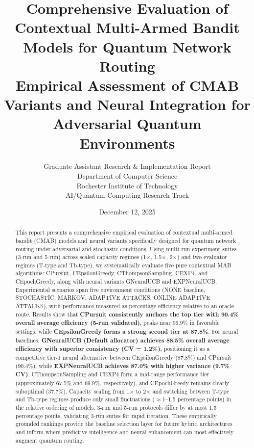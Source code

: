 \documentclass[12pt,a4paper]{article}
\title{\textbf{Comprehensive Evaluation of Contextual Multi-Armed Bandit Models for Quantum Network Routing}\\
\large{Empirical Assessment of CMAB Variants and Neural Integration for Adversarial Quantum Environments}}
\author{Graduate Assistant Research \& Implementation Report\\ 
Department of Computer Science \\ 
Rochester Institute of Technology \\ 
AI/Quantum Computing Research Track}
\date{December 12, 2025}
\newcommand{\performance}[1]{\textcolor{performancecolor}{\textbf{#1}}}
\newcommand{\legacy}[1]{\textcolor{legacycolor}{\textbf{#1}}}
\newcommand{\neural}[1]{\textcolor{neuralcolor}{\textbf{#1}}}
\begin{document}
\maketitle

\begin{abstract}
This report presents a comprehensive empirical evaluation of contextual multi-armed bandit (CMAB) models and neural variants specifically designed for quantum network routing under adversarial and stochastic conditions. Using multi-run experiment suites (3-run and 5-run) across scaled capacity regimes (1$\times$, 1.5$\times$, 2$\times$) and two evaluator regimes (T-type and Tb-type), we systematically evaluate five pure contextual MAB algorithms: CPursuit, CEpsilonGreedy, CThompsonSampling, CEXP4, and CEpochGreedy, along with neural variants GNeuralUCB and EXPNeuralUCB. Experimental scenarios span five environment conditions (NONE baseline, STOCHASTIC, MARKOV, ADAPTIVE ATTACKS, ONLINE ADAPTIVE ATTACKS), with performance measured as percentage efficiency relative to an oracle route. Results show that \performance{CPursuit consistently anchors the top tier with 90.4\% overall average efficiency (5-run validated)}, peaks near 96.9\% in favorable settings, while \performance{CEpsilonGreedy forms a strong second tier at 87.8\%}. For neural baselines, \neural{GNeuralUCB (Default allocator) achieves 88.5\% overall average efficiency with superior consistency (CV = 1.2\%)}, positioning it as a competitive tier-1 neural alternative between CEpsilonGreedy (87.8\%) and CPursuit (90.4\%), while \legacy{EXPNeuralUCB achieves 87.0\% with higher variance (9.7\% CV)}. CThompsonSampling and CEXP4 form a mid-range performance tier (approximately 67.5\% and 69.9\%, respectively), and CEpochGreedy remains clearly suboptimal (37.7\%). Capacity scaling from 1$\times$ to 2$\times$ and switching between T-type and Tb-type regimes produce only small fluctuations ($\approx$1--1.5 percentage points) in the relative ordering of models. 3-run and 5-run protocols differ by at most 1.5 percentage points, validating 3-run suites for rapid iteration. These empirically grounded rankings provide the baseline selection layer for future hybrid architectures and inform where predictive intelligence and neural enhancement can most effectively augment quantum routing.
\end{abstract}

\newpage
{\tableofcontents}

\newpage
\end{document}
